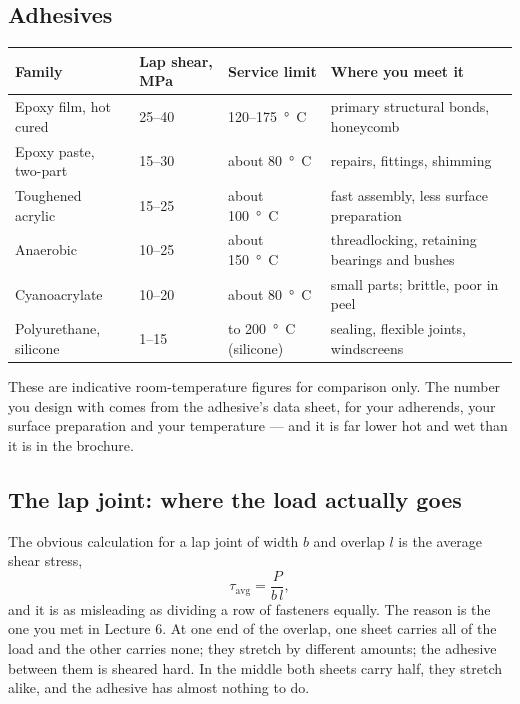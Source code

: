 \documentclass[11pt,a4paper]{article}
\begin{document}
\subsection{Adhesives}

\begin{center}\footnotesize
\begin{tabular}{@{}p{3.5cm}p{2.6cm}p{2.5cm}p{6.2cm}@{}}
\toprule
\textbf{Family} & \textbf{Lap shear, MPa} & \textbf{Service limit} & \textbf{Where you meet it}\\
\midrule
Epoxy film, hot cured & 25--40 & 120--\SI{175}{\degree C} & primary structural bonds, honeycomb\\
Epoxy paste, two-part & 15--30 & about \SI{80}{\degree C} & repairs, fittings, shimming\\
Toughened acrylic & 15--25 & about \SI{100}{\degree C} & fast assembly, less surface preparation\\
Anaerobic & 10--25 & about \SI{150}{\degree C} & threadlocking, retaining bearings and bushes\\
Cyanoacrylate & 10--20 & about \SI{80}{\degree C} & small parts; brittle, poor in peel\\
Polyurethane, silicone & 1--15 & to \SI{200}{\degree C} (silicone) & sealing, flexible joints, windscreens\\
\bottomrule
\end{tabular}
\end{center}

\noindent These are indicative room-temperature figures for comparison only. The number you design
with comes from the adhesive's data sheet, for your adherends, your surface preparation and your
temperature --- and it is far lower hot and wet than it is in the brochure.

\subsection{The lap joint: where the load actually goes}
\label{sec:lap}

The obvious calculation for a lap joint of width $b$ and overlap $l$ is the average shear stress,
\begin{equation}
\tau_{\text{avg}}=\frac{P}{b\,l},
\end{equation}
and it is as misleading as dividing a row of fasteners equally. The reason is the one you met in
Lecture 6. At one end of the overlap, one sheet carries all of the load and the other carries
none; they stretch by different amounts; the adhesive between them is sheared hard. In the middle
both sheets carry half, they stretch alike, and the adhesive has almost nothing to do.
\end{document}
